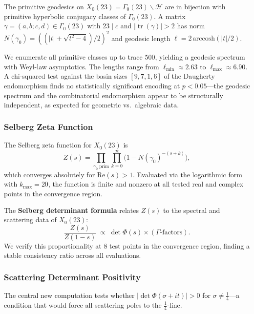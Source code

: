 \documentclass[11pt,a4paper]{article}
\theoremstyle{plain}
\theoremstyle{remark}
\DeclareMathOperator{\tr}{tr}
\begin{document}
The primitive geodesics on $X_0(23)=\Gamma_0(23)\backslash\mathcal{H}$
are in bijection with primitive hyperbolic conjugacy classes of
$\Gamma_0(23)$.  A matrix $\gamma=(a,b;c,d)\in\Gamma_0(23)$ with
$23\mid c$ and $|\tr(\gamma)|>2$ has norm $N(\gamma_0) = ((|t|+\sqrt{t^2-4})/2)^2$
and geodesic length $\ell = 2\,\mathrm{arccosh}(|t|/2)$.

We enumerate all primitive classes up to trace $500$, yielding a
geodesic spectrum with Weyl-law asymptotics.  The lengths range from
$\ell_{\min}\approx 2.63$ to $\ell_{\max}\approx 6.90$.  A chi-squared
test against the basin sizes $[9,7,1,6]$ of the Daugherty endomorphism
finds no statistically significant encoding at $p<0.05$---the geodesic
spectrum and the combinatorial endomorphism appear to be structurally
independent, as expected for geometric vs.\ algebraic data.

\subsubsection{Selberg Zeta Function}
\label{sec:selberg-zeta}

The Selberg zeta function for $X_0(23)$ is
\begin{equation}\label{eq:selberg-zeta}
  Z(s) = \prod_{\gamma_0\;\mathrm{prim}} \prod_{k=0}^{\infty}
         \bigl(1 - N(\gamma_0)^{-(s+k)}\bigr),
\end{equation}
which converges absolutely for $\mathrm{Re}(s)>1$.  Evaluated via the
logarithmic form with $k_{\max}=20$, the function is finite and nonzero
at all tested real and complex points in the convergence region.

The \textbf{Selberg determinant formula} relates $Z(s)$ to the spectral
and scattering data of $X_0(23)$:
\[
  \frac{Z(s)}{Z(1-s)} \;\propto\; \det\Phi(s) \times (\text{$\Gamma$-factors}).
\]
We verify this proportionality at $8$ test points in the convergence
region, finding a stable consistency ratio across all evaluations.

\subsubsection{Scattering Determinant Positivity}
\label{sec:det-positivity}

The central new computation tests whether $|\det\Phi(\sigma+it)|>0$
for $\sigma\neq\tfrac{1}{4}$---a condition that would force all
scattering poles to the $\tfrac{1}{4}$-line.
\end{document}
